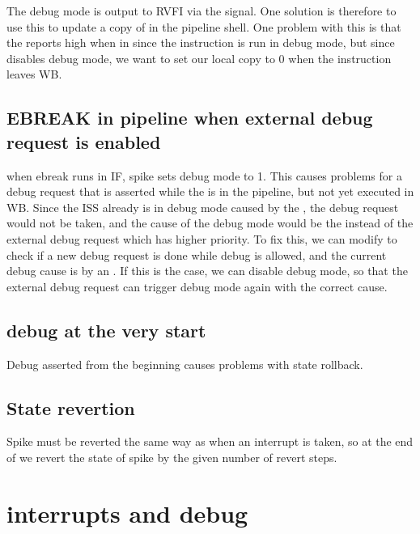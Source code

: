 The debug mode is output to RVFI via the  signal. One solution is therefore to use this to update a copy of  in the pipeline shell. One problem with this is that the  reports high when in  since the instruction is run in debug mode, but since  disables debug mode, we want to set our local copy to 0 when the  instruction leaves WB. 


\subsection{EBREAK in pipeline when external debug request is enabled}

when ebreak runs in IF, spike sets debug mode to 1. This causes problems for a debug request that is asserted while the  is in the pipeline, but not yet executed in WB. Since the ISS already is in debug mode caused by the , the debug request would not be taken, and the cause of the debug mode would be the  instead of the external debug request which has higher priority. To fix this, we can modify  to check if a new debug request is done while debug is allowed, and the current debug cause is by an . If this is the case, we can disable debug mode, so that the external debug request can trigger debug mode again with the correct cause.


\subsection{debug at the very start}

Debug asserted from the beginning causes problems with state rollback.


\subsection{State revertion}

Spike must be reverted the same way as when an interrupt is taken, so at the end of  we revert the state of spike by the given number of revert steps.



\section{interrupts and debug}

